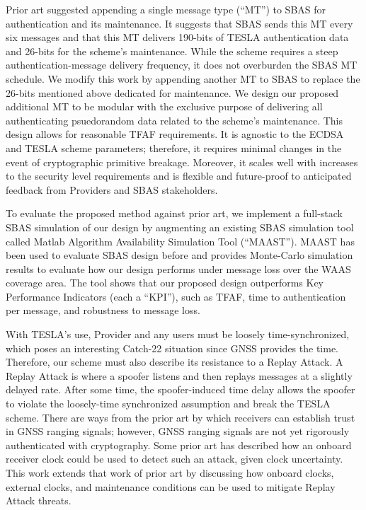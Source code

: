 \documentclass[APA,STIX1COL]{IONjournal/ION-APA Template}
\begin{document}
	Prior art suggested appending a single message type (``MT'') to SBAS for authentication and its maintenance\cite{Neish_Dissertation}.
	It suggests that SBAS sends this MT every six messages and that this MT delivers 190-bits of TESLA authentication data and 26-bits for the scheme's maintenance.
	While the scheme requires a steep authentication-message delivery frequency, it does not overburden the SBAS MT schedule.
	We modify this work by appending another MT to SBAS to replace the 26-bits mentioned above dedicated for maintenance.
	We design our proposed additional MT to be modular with the exclusive purpose of delivering all authenticating psuedorandom data related to the scheme's maintenance.
	This design allows for reasonable TFAF requirements.
	It is agnostic to the ECDSA and TESLA scheme parameters; therefore, it requires minimal changes in the event of cryptographic primitive breakage.
	Moreover, it scales well with increases to the security level requirements and is flexible and future-proof to anticipated feedback from Providers and SBAS stakeholders.

	To evaluate the proposed method against prior art, we implement a full-stack SBAS simulation of our design by augmenting an existing SBAS simulation tool called Matlab Algorithm Availability Simulation Tool (``MAAST'')\cite{MAAST}.
	MAAST has been used to evaluate SBAS design before and provides Monte-Carlo simulation results to evaluate how our design performs under message loss over the WAAS coverage area.
	The tool shows that our proposed design outperforms Key Performance Indicators (each a ``KPI''), such as TFAF, time to authentication per message, and robustness to message loss.

	With TESLA's use, Provider and any users must be loosely time-synchronized, which poses an interesting Catch-22 situation since GNSS provides the time.
	Therefore, our scheme must also describe its resistance to a Replay Attack.
	A Replay Attack is where a spoofer listens and then replays messages at a slightly delayed rate.
	After some time, the spoofer-induced time delay allows the spoofer to violate the loosely-time synchronized assumption and break the TESLA scheme.
	There are ways from the prior art by which receivers can establish trust in GNSS ranging signals\cite{Psiaki2016,Fernandez-Hernandez2018}; however, GNSS ranging signals are not yet rigorously authenticated with cryptography.
	Some prior art has described how an onboard receiver clock could be used to detect such an attack, given clock uncertainty\cite{time_sync_paper}.
	This work extends that work of prior art by discussing how onboard clocks, external clocks, and maintenance conditions can be used to mitigate Replay Attack threats.
\end{document}
